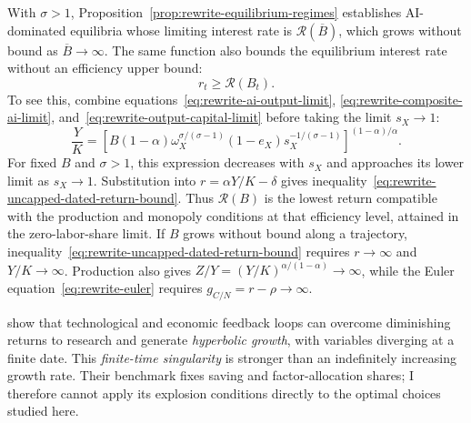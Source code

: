 With $\sigma>1$, Proposition~\ref{prop:rewrite-equilibrium-regimes}
establishes AI-dominated equilibria whose limiting interest rate is
$\mathcal R(\overline B)$, which grows without bound as
$\overline B\to\infty$. %
The same function also bounds the equilibrium interest rate
without an efficiency upper bound:
\begin{equation}
 r_t\geq\mathcal R(B_t)%
 .
 \label{eq:rewrite-uncapped-dated-return-bound}
\end{equation}
To see this, combine equations~\eqref{eq:rewrite-ai-output-limit},
\eqref{eq:rewrite-composite-ai-limit}, and~\eqref{eq:rewrite-output-capital-limit}
before taking the limit $s_X\to1$:
\begin{equation}
 \frac YK=
 \left[B(1-\alpha)\omega_X^{\sigma/(\sigma-1)}
 (1-e_X)s_X^{-1/(\sigma-1)}\right]^{(1-\alpha)/\alpha}.
 \label{eq:rewrite-substitutes-dated-output-capital}
\end{equation}
For fixed $B$ and $\sigma>1$, this expression decreases with $s_X$ and
approaches its lower limit as $s_X\to1$.
Substitution into $r=\alpha Y/K-\delta$ gives
inequality~\eqref{eq:rewrite-uncapped-dated-return-bound}.
Thus $\mathcal R(B)$ is the lowest return compatible with the production
and monopoly conditions at that efficiency level, attained in the
zero-labor-share limit. If $B$ grows without bound along a trajectory, inequality~\eqref{eq:rewrite-uncapped-dated-return-bound} requires
$r\to\infty$ and $Y/K\to\infty$. Production also gives
$Z/Y=(Y/K)^{\alpha/(1-\alpha)}\to\infty$, while the Euler
equation~\eqref{eq:rewrite-euler} requires
$g_{C/N}=r-\rho\to\infty$.

\citet{davidsonetal2026} show that technological and economic feedback loops
can overcome diminishing returns to research and generate \emph{hyperbolic
growth}, with variables diverging at a finite date. This \emph{finite-time
singularity} is stronger than an indefinitely increasing growth rate.
Their benchmark fixes saving and factor-allocation shares; I therefore
cannot apply its explosion conditions directly to the optimal choices
studied here.

